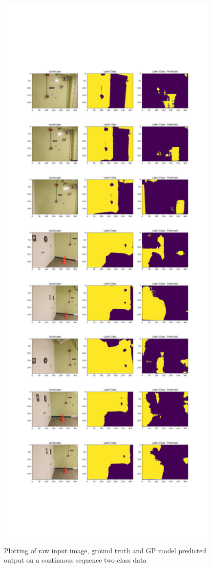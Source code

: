 	\begin{figure}
		\centering
		\includegraphics[width=16cm]{images/output_gp.png}
		\caption{Plotting of raw input image, ground truth and GP model predicted output on a continuous sequence two class data }
		\label{fig:output_gp}
	\end{figure}
	
